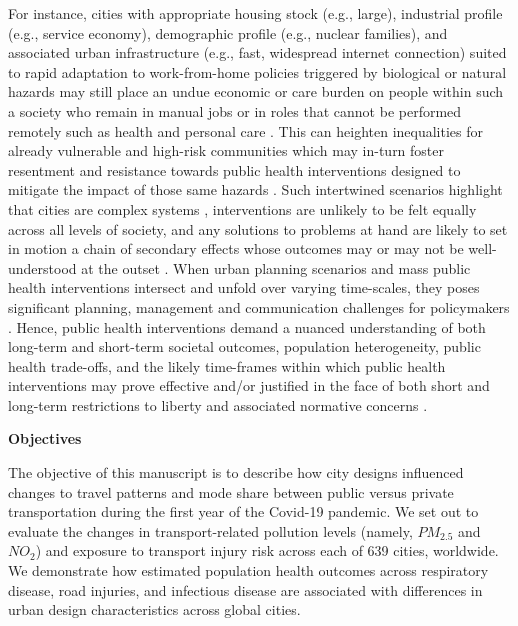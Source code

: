 \documentclass[preprint,12pt]{elsarticle}
\begin{document}
For instance, cities with appropriate housing stock (e.g., large), industrial profile (e.g., service economy), demographic profile (e.g., nuclear families), and associated urban infrastructure (e.g., fast, widespread internet connection) suited to rapid adaptation to work-from-home policies triggered by biological or natural hazards may still place an undue economic or care burden on people within such a society who remain in manual jobs or in roles that cannot be performed remotely such as health and personal care \cite{CraigWFH,Vyas2021}. This can heighten inequalities for already vulnerable and high-risk communities \cite{martin2020fighting} which may in-turn foster resentment and resistance towards public health interventions designed to mitigate the impact of those same hazards \cite{de2016sustainability}. Such intertwined scenarios highlight that cities are complex systems \cite{DiezRoux2015}, interventions are unlikely to be felt equally across all levels of society, and any solutions to problems at hand are likely to set in motion a chain of secondary effects whose outcomes may or may not be well-understood at the outset \cite{Sterman2006}. When urban planning scenarios and mass public health interventions intersect and unfold over varying time-scales, they poses significant planning, management and communication challenges for policymakers \cite{thompson2022modelling,thompson2022framework}. Hence, public health interventions demand a nuanced understanding of both long-term and short-term societal outcomes, population heterogeneity, public health trade-offs, and the likely time-frames within which public health interventions may prove effective and/or justified in the face of both short and long-term restrictions to liberty and associated normative concerns \cite{dawson2016snakes, oliu2021sars}.



\textbf{Objectives}


The objective of this manuscript is to describe how city designs influenced changes to travel patterns and mode share between public versus private transportation during the first year of the Covid-19 pandemic. We set out to evaluate the changes in transport-related pollution levels (namely, \(PM_{2.5}\) and \(NO_{2}\)) and exposure to transport injury risk across each of 639 cities, worldwide. We demonstrate how estimated population health outcomes across respiratory disease, road injuries, and infectious disease are associated with differences in urban design characteristics across global cities.
\end{document}
